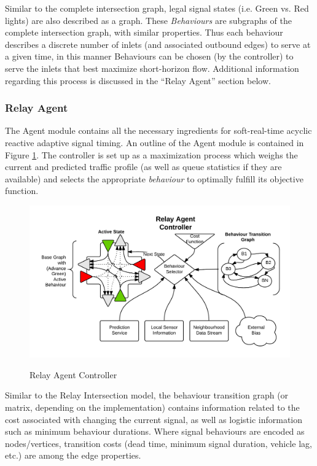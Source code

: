 \documentclass{report}
\begin{document}
Similar to the complete intersection graph, legal signal states (i.e. Green vs. Red lights) are also described as a graph.
These \emph{Behaviours} are subgraphs of the complete intersection graph, with similar properties.
Thus each behaviour describes a discrete number of inlets (and associated outbound edges) to serve at a given time, in this manner Behaviours can be chosen (by the controller) to serve the inlets that best maximize short-horizon flow.
Additional information regarding this process is discussed in the ``Relay Agent'' section below.\\

\subsubsection{Relay Agent}
The Agent module contains all the necessary ingredients for soft-real-time acyclic reactive adaptive signal timing.
An outline of the Agent module is contained in Figure \ref{fig:Relay_Agent_Controller}.
The controller is set up as a maximization process which weighs the current and predicted traffic profile (as well as queue statistics if they are available) and selects the appropriate \emph{behaviour} to optimally fulfill its objective function.\\

\begin{figure}[H]
	\caption{Relay Agent Controller}
	\includegraphics[width=\textwidth]{figures/Relay_Agent_Controller.png}
	\label{fig:Relay_Agent_Controller}
\end{figure}

Similar to the Relay Intersection model, the behaviour transition graph (or matrix, depending on the implementation) contains information related to the cost associated with changing the current signal, as well as logistic information such as minimum behaviour durations.
Where signal behaviours are encoded as nodes/vertices, transition costs (dead time, minimum signal duration, vehicle lag, etc.) are among the edge properties. \\
\end{document}
